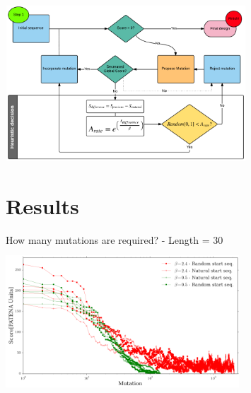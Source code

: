 \documentclass{beamer}
\begin{document}
\begin{frame}
\vspace{-0.5\baselineskip}
\begin{adjustwidth}{-1.5em}{-2.5em}
\includegraphics[width=340px,height=220px]{../img/patenaFixed.png} 
\end{adjustwidth}
\end{frame}





\section{Results}

\begin{frame}
\begin{adjustwidth}{-1.5em}{-2.5em}
\centering
How many mutations are required?  - \hspace{5px} Length = 30   
\includegraphics[width=330px,height=210px]{../img/scoreVsMutation-individual.png} 

\end{adjustwidth}
\end{frame}
\end{document}
